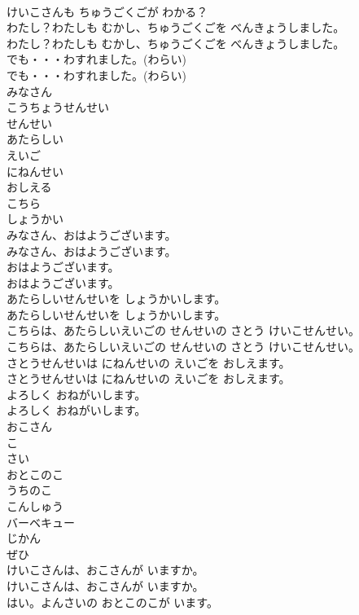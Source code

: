 \documentclass[8pt]{extreport}
\begin{document}
\begin{CJK}{UTF8}{min}
\\	けいこさんも ちゅうごくごが わかる？
\\	わたし？わたしも むかし、ちゅうごくごを べんきょうしました。
\\	わたし？わたしも むかし、ちゅうごくごを べんきょうしました。
\\	でも・・・わすれました。(わらい)
\\	でも・・・わすれました。(わらい)
\\	みなさん
\\	こうちょうせんせい
\\	せんせい
\\	あたらしい
\\	えいご
\\	にねんせい
\\	おしえる
\\	こちら
\\	しょうかい
\\	みなさん、おはようございます。
\\	みなさん、おはようございます。
\\	おはようございます。
\\	おはようございます。
\\	あたらしいせんせいを  しょうかいします。
\\	あたらしいせんせいを  しょうかいします。
\\	こちらは、あたらしいえいごの せんせいの さとう けいこせんせい。
\\	こちらは、あたらしいえいごの せんせいの さとう けいこせんせい。
\\	さとうせんせいは にねんせいの えいごを おしえます。
\\	さとうせんせいは にねんせいの えいごを おしえます。
\\	よろしく おねがいします。
\\	よろしく おねがいします。
\\	おこさん
\\	こ
\\	さい
\\	おとこのこ
\\	うちのこ
\\	こんしゅう
\\	バーベキュー
\\	じかん
\\	ぜひ
\\	けいこさんは、おこさんが いますか。
\\	けいこさんは、おこさんが いますか。
\\	はい。よんさいの おとこのこが います。

\end{CJK}
\end{document}
